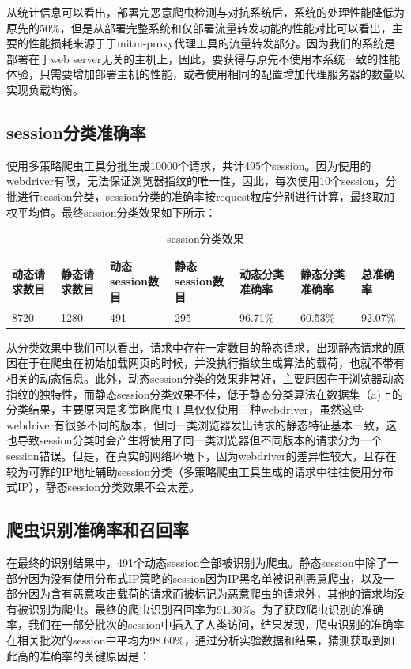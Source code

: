 \documentclass[doctor,privacy,twoside]{buaa_mac}
\begin{document}
从统计信息可以看出，部署完恶意爬虫检测与对抗系统后，系统的处理性能降低为原先的50\%，但是从部署完整系统和仅部署流量转发功能的性能对比可以看出，主要的性能损耗来源于于mitm-proxy代理工具的流量转发部分。因为我们的系统是部署在于web server无关的主机上，因此，要获得与原先不使用本系统一致的性能体验，只需要增加部署主机的性能，或者使用相同的配置增加代理服务器的数量以实现负载均衡。



\subsection{session分类准确率}
使用多策略爬虫工具分批生成10000个请求，共计495个session。因为使用的webdriver有限，无法保证浏览器指纹的唯一性，因此，每次使用10个session，分批进行session分类，session分类的准确率按request粒度分别进行计算，最终取加权平均值。最终session分类效果如下所示：

\centerline{}
\begin{table}[h]
  \caption{session分类效果}
  \label{tab:papercomponents}
  \centering
\begin{tabular}{|p{2cm}<{\centering}||p{2cm}<{\centering}|p{2cm}<{\centering}|p{2cm}<{\centering}|p{2cm}<{\centering}|p{2cm}<{\centering}|p{2cm}<{\centering}|}
    \hline
  动态请求数目 &  静态请求数目 & 动态session数目 &  静态session数目  & 动态分类准确率  & 静态分类准确率  & 总准确率 \\
    \hline
8720 & 1280 & 491 & 295 & 96.71\% & 60.53\% & 92.07\% \\

\hline
    \end{tabular}
\end{table}
\centerline{}


从分类效果中我们可以看出，请求中存在一定数目的静态请求，出现静态请求的原因在于在爬虫在初始加载网页的时候，并没执行指纹生成算法的载荷，也就不带有相关的动态信息。此外，动态session分类的效果非常好，主要原因在于浏览器动态指纹的独特性，而静态session分类效果不佳，低于静态分类算法在数据集（a)上的分类结果，主要原因是多策略爬虫工具仅仅使用三种webdriver，虽然这些webdriver有很多不同的版本，但同一类浏览器发出请求的静态特征基本一致，这也导致session分类时会产生将使用了同一类浏览器但不同版本的请求分为一个session错误。但是，在真实的网络环境下，因为webdriver的差异性较大，且存在较为可靠的IP地址辅助session分类（多策略爬虫工具生成的请求中往往使用分布式IP），静态session分类效果不会太差。


\subsection{爬虫识别准确率和召回率}
在最终的识别结果中，491个动态session全部被识别为爬虫。静态session中除了一部分因为没有使用分布式IP策略的session因为IP黑名单被识别恶意爬虫，以及一部分因为含有恶意攻击载荷的请求而被标记为恶意爬虫的请求外，其他的请求均没有被识别为爬虫。最终的爬虫识别召回率为91.30\%。为了获取爬虫识别的准确率，我们在一部分批次的session中插入了人类访问，结果发现，爬虫识别的准确率在相关批次的session中平均为98.60\%，通过分析实验数据和结果，猜测获取到如此高的准确率的关键原因是：
\end{document}
